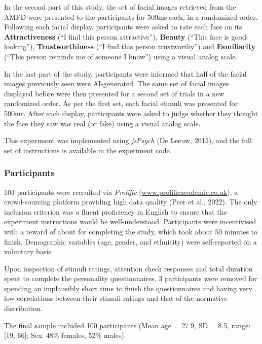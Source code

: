 \documentclass[
  man,floatsintext]{apa6}
\begin{document}
In the second part of this study, the set of facial images retrieved from the AMFD were presented to the participants for 500ms each, in a randomized order. Following each facial display, participants were asked to rate each face on its \textbf{Attractiveness} (``I find this person attractive''), \textbf{Beauty} (``This face is good-looking''), \textbf{Trustworthiness} (``I find this person trustworthy'') and \textbf{Familiarity} (``This person reminds me of someone I know'') using a visual analog scale.

In the last part of the study, participants were informed that half of the facial images previously seen were AI-generated. The same set of facial images displayed before were then presented for a second set of trials in a new randomized order. As per the first set, each facial stimuli was presented for 500ms. After each display, participants were asked to judge whether they thought the face they saw was real (or fake) using a visual analog scale.

This experiment was implemented using \emph{jsPsych} (De Leeuw, 2015), and the full set of instructions is available in the experiment code.

\hypertarget{participants}{%
\subsubsection{Participants}\label{participants}}

103 participants were recruited via \emph{Prolific} (\url{www.prolificacademic.co.uk}), a crowd-sourcing platform providing high data quality (Peer et al., 2022). The only inclusion criterion was a fluent proficiency in English to ensure that the experiment instructions would be well-understood. Participants were incentivised with a reward of about  for completing the study, which took about 50 minutes to finish. Demographic variables (age, gender, and ethnicity) were self-reported on a voluntary basis.

Upon inspection of stimuli ratings, attention check responses and total duration spent to complete the personality questionnaires, 3 participants were removed for spending an implausibly short time to finish the questionnaires and having very low correlations between their stimuli ratings and that of the normative distribution.

The final sample included 100 participants (Mean age = 27.9, SD = 8.5, range: {[}19, 66{]}; Sex: 48\% females, 52\% males).
\end{document}
